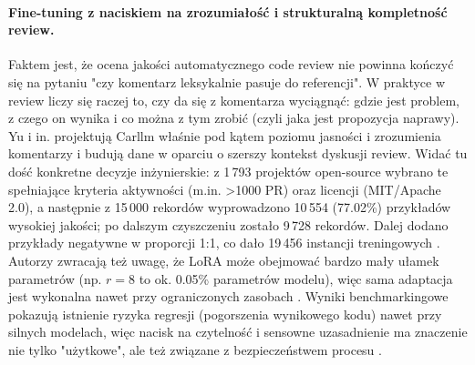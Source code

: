 \paragraph{Fine-tuning z naciskiem na zrozumiałość i strukturalną kompletność review.}
Faktem jest, że ocena jakości automatycznego code review nie powinna kończyć się na pytaniu "czy komentarz leksykalnie pasuje do referencji".
W praktyce w review liczy się raczej to, czy da się z komentarza wyciągnąć: gdzie jest problem, z czego on wynika i co można z 
tym zrobić (czyli jaka jest propozycja naprawy). Yu i in. projektują Carllm właśnie pod kątem poziomu jasności i
zrozumienia komentarzy i budują dane w oparciu o szerszy kontekst dyskusji review. Widać tu dość konkretne decyzje inżynierskie: z 1\,793 projektów 
open-source wybrano te spełniające kryteria aktywności (m.in. >1000 PR) oraz licencji (MIT/Apache 
2.0), a następnie z 15\,000 rekordów wyprowadzono 10\,554 (77.02\%) przykładów wysokiej jakości; 
po dalszym czyszczeniu zostało 9\,728 rekordów. Dalej dodano przykłady negatywne w proporcji 
1:1, co dało 19\,456 instancji treningowych \cite{Yu2024Carllm}. Autorzy zwracają też uwagę, że 
LoRA może obejmować bardzo mały ułamek parametrów (np. \(r=8\) to ok. 0.05\% 
parametrów modelu), więc sama adaptacja jest wykonalna nawet przy ograniczonych zasobach \cite{Yu2024Carllm}.
Wyniki benchmarkingowe pokazują istnienie ryzyka regresji (pogorszenia wynikowego kodu) 
nawet przy silnych modelach, więc nacisk na czytelność i sensowne uzasadnienie ma 
znaczenie nie tylko "użytkowe", ale też związane z bezpieczeństwem procesu \cite{Cihan2025EvaluatingLLMsForCodeReview}.

